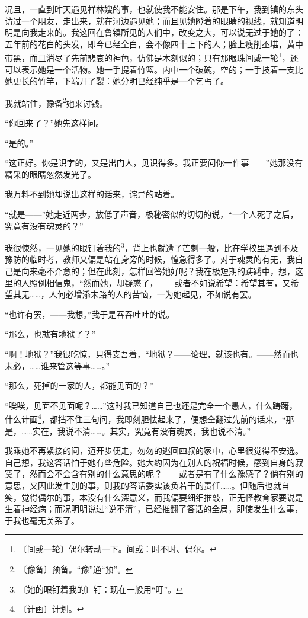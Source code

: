 \documentclass[12pt,UTF-8,openany]{ctexbook}
\begin{document}
\begin{large}
    况且，一直到昨天遇见祥林嫂的事，也就使我不能安住。那是下午，我到镇的东头访过一个朋友，走出来，就在河边遇见她；而且见她瞪着的眼睛的视线，就知道明明是向我走来的。我这回在鲁镇所见的人们中，改变之大，可以说无过于她的了：五年前的花白的头发，即今已经全白，会不像四十上下的人；脸上瘦削丕堪，黄中带黑，而且消尽了先前悲哀的神色，仿佛是木刻似的；只有那眼珠间或一轮\footnote{〔间或一轮〕偶尔转动一下。间或：时不时、偶尔。}，还可以表示她是一个活物。她一手提着竹篮。内中一个破碗，空的；一手技着一支比她更长的竹竿，下端开了裂：她分明已经纯乎是一个乞丐了。
    
    我就站住，豫备\footnote{〔豫备〕预备。“豫”通“预”。}她来讨钱。
    
    “你回来了？”她先这样问。
    
    “是的。”
    
    “这正好。你是识字的，又是出门人，见识得多。我正要问你一件事——”她那没有精采的眼睛忽然发光了。
    
    我万料不到她却说出这样的话来，诧异的站着。
    
    “就是——”她走近两步，放低了声音，极秘密似的切切的说，“一个人死了之后，究竟有没有魂灵的？”
    
    我很悚然，一见她的眼钉着我的\footnote{〔她的眼钉着我的〕钉：现在一般用“盯”。}，背上也就遭了芒刺一般，比在学校里遇到不及豫防的临时考，教师又偏是站在身旁的时候，惶急得多了。对于魂灵的有无，我自己是向来毫不介意的；但在此刻，怎样回答她好呢？我在极短期的踌躇中，想，这里的人照例相信鬼，“然而她，却疑惑了，——或者不如说希望：希望其有，又希望其无……，人何必增添末路的人的苦恼，一为她起见，不如说有罢。
    
    “也许有罢，——我想。”我于是吞吞吐吐的说。
    
    “那么，也就有地狱了？”
    
    “啊！地狱？”我很吃惊，只得支吾着，“地狱？——论理，就该也有。——然而也未必，……谁来管这等事……。”
    
    “那么，死掉的一家的人，都能见面的？”
    
    “唉唉，见面不见面呢？……”这时我已知道自己也还是完全一个愚人，什么踌躇，什么计画\footnote{〔计画〕计划。}，都挡不住三句问，我即刻胆怯起来了，便想全翻过先前的话来，“那是，……实在，我说不清……。其实，究竟有没有魂灵，我也说不清。”
    
    我乘她不再紧接的问，迈开步便走，勿勿的逃回四叔的家中，心里很觉得不安逸。自己想，我这答话怕于她有些危险。她大约因为在别人的祝福时候，感到自身的寂寞了，然而会不会含有别的什么意思的呢？——或者是有了什么豫感了？倘有别的意思，又因此发生别的事，则我的答话委实该负若干的责任……。但随后也就自笑，觉得偶尔的事，本没有什么深意义，而我偏要细细推敲，正无怪教育家要说是生着神经病；而况明明说过“说不清”，已经推翻了答话的全局，即使发生什么事，于我也毫无关系了。
    

\end{large}
\end{document}
